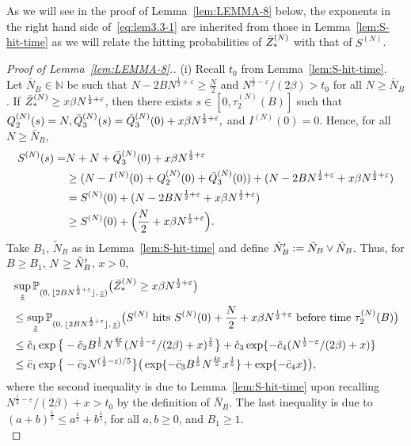 \documentclass[11pt, reqno]{article}
\numberwithin{equation}{section}
\numberwithin{theorem}{section}
\newcommand\blue[1]{#1}
\begin{document}
\blue{As we will see in the proof of Lemma~\ref{lem:LEMMA-8} below, the exponents in the right hand side of~\eqref{eq:lem3.3-1} are inherited from those in Lemma~\ref{lem:S-hit-time} as we will relate the hitting probabilities of $\Bar{Z}^{(N)}_{*}$ with that of $S^{(N)}$.}
\begin{proof}[Proof of Lemma~\ref{lem:LEMMA-8}.]
(i) Recall $t_0$ from Lemma~\ref{lem:S-hit-time}. Let $\bar{N}_B\in\mathbb{N}$ be such that $N-2BN^{\frac{1}{2}+\varepsilon}\geq  \frac{N}{2}$ and $N^{\frac{1}{2}-\varepsilon}/(2\beta) >t_0$ for all $N\geq \bar{N}_B$.
If $\Bar{Z}^{(N)}_{*}\geq x\beta N^{\frac{1}{2}+\varepsilon}$, then there exists $s\in[0,\tau^{(N)}_2(B)]$ such that $Q^{(N)}_2(s)=N, \Bar{Q}^{(N)}_3(s)=\Bar{Q}^{(N)}_3(0)+x\beta N^{\frac{1}{2}+\varepsilon},$ and $I^{(N)}(0)=0$. 
Hence, for all $N \ge \bar{N}_B$,
\begin{align*}
        S^{(N)}(s)=&N+N+\Bar{Q}^{(N)}_3(0)+x\beta N^{\frac{1}{2}+\varepsilon}\\
        &\ge (N-I^{(N)}(0)+Q_2^{(N)}(0)+\Bar{Q}^{(N)}_3(0))+(N-2B N^{\frac{1}{2}+\varepsilon}+x\beta N^{\frac{1}{2}+\varepsilon})\\
        &= S^{(N)}(0)+(N-2BN^{\frac{1}{2}+\varepsilon}+x\beta N^{\frac{1}{2}+\varepsilon})\\
        &\geq  S^{(N)}(0)+\Big(\frac{N}{2}+x\beta N^{\frac{1}{2}+\varepsilon}\Big).
    \end{align*}
Take $B_1$, $\tilde N_B$ as in Lemma~\ref{lem:S-hit-time} and define $\Tilde{N}'_B :=\tilde N_B\vee \bar{N}_B$.
    Thus, for $B\geq B_1$, $N\geq\Tilde{N}'_B$, $x>0$,
    \begin{align*}
        &\sup_{\underline{z}}\mathbb{P}_{(0, \, \lfloor 2BN^{\frac{1}{2}+\varepsilon} \rfloor, \,\underline{z})}\big(\Bar{Z}^{(N)}_{*}\geq x\beta N^{\frac{1}{2}+\varepsilon}\big)\\
        &\leq  \sup_{\underline{z}}\mathbb{P}_{(0, \, \lfloor 2BN^{\frac{1}{2}+\varepsilon} \rfloor, \,\underline{z})}\big(S^{(N)}\text{ hits }S^{(N)}(0)+\frac{N}{2}+x\beta N^{\frac{1}{2}+\varepsilon}\text{ before time }\tau^{(N)}_2(B)\big)\\
        &\leq  \hat{c}_1\exp \big\{-\hat{c}_2 B^{\frac{1}{5}}N^{\frac{4\varepsilon}{5}}(N^{\frac{1}{2}-\varepsilon}/(2\beta)+x)^{\frac{1}{5}}\big\}+\hat{c}_3\exp \{-\hat{c}_4(N^{\frac{1}{2}-\varepsilon}/(2\beta)+x)\}\\
        & \leq  \bar{c}_1\exp \big\{-\bar{c}_2N^{(\frac{1}{2}-\varepsilon)/5}\big\}\big(\exp \{-\bar{c}_3B^{\frac{1}{5}}N^{\frac{4\varepsilon}{5}}x^{\frac{1}{5}}\}+\exp \{-\bar{c}_4x \}\big),
    \end{align*}
    where the second inequality is due to Lemma~\ref{lem:S-hit-time} upon recalling $N^{\frac{1}{2}-\varepsilon}/(2\beta)+x>t_0$ by the definition of $\bar{N}_B$. The last inequality is due to $(a+b)^{\frac{1}{5}}\leq a^{\frac{1}{5}}+b^{\frac{1}{5}}$, for all $a,b\geq 0$, and $B_1 \ge 1$.\\


\end{proof}
\end{document}
